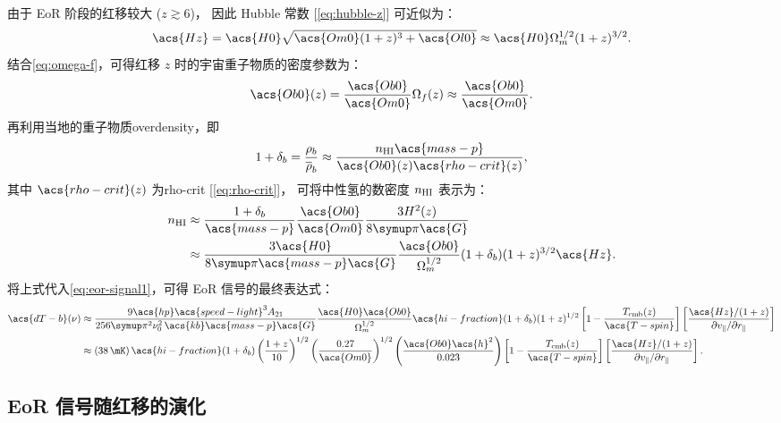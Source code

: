 由于 EoR 阶段的红移较大 ($z \gtrsim 6$)，
因此 Hubble 常数 [\autoref{eq:hubble-z}] 可近似为：
\begin{equation}
  \acs{Hz} = \acs{H0} \sqrt{\acs{Om0} (1+z)^3 + \acs{Ol0}}
    \approx \acs{H0} \Omega_m^{1/2} (1+z)^{3/2} .
\end{equation}
结合\autoref{eq:omega-f}，可得红移 $z$ 时的宇宙重子物质的密度参数为：
\begin{equation}
  \acs{Ob0}(z) = \frac{\acs{Ob0}}{\acs{Om0}} \Omega_f(z)
    \approx \frac{\acs{Ob0}}{\acs{Om0}} .
\end{equation}
再利用当地的重子物质\ac{overdensity}，即
\begin{equation}
  1 + \delta_b = \frac{\rho_b}{\overline{\rho}_b}
    \approx \frac{n_{\R{HI}} \acs{mass-p}}{\acs{Ob0}(z) \acs{rho-crit}(z)} ,
\end{equation}
其中 $\acs{rho-crit}(z)$ 为\acl{rho-crit} [\autoref{eq:rho-crit}]，
可将中性氢的数密度 $n_{\mathrm{HI}}$ 表示为：
\begin{align}
  n_{\R{HI}}
    & \approx \frac{1+\delta_b}{\acs{mass-p}} \frac{\acs{Ob0}}{\acs{Om0}}
      \frac{3 H^2(z)}{8 \Cpi \acs{G}}  \\
    & \approx \frac{3 \acs{H0}}{8\Cpi\acs{mass-p}\acs{G}}
      \frac{\acs{Ob0}}{\Omega_m^{1/2}} (1+\delta_b) (1+z)^{3/2} \acs{Hz} .
\end{align}
将上式代入\autoref{eq:eor-signal1}，可得 EoR 信号的最终表达式：
\begin{align}
  \acs{dT-b}(\nu)
    & \approx \frac{9 \acs{hp} \acs{speed-light}^3 A_{21}}{
      256\Cpi^2 \nu_0^2 \,\acs{kb} \acs{mass-p} \acs{G}}
      \frac{\acs{H0} \acs{Ob0}}{\Omega_m^{1/2}}
      \acs{hi-fraction} (1+\delta_b) (1+z)^{1/2}
      \left[ 1 - \frac{T_{\R{cmb}}(z)}{\acs{T-spin}} \right]
      \left[ \frac{\acs{Hz} / (1+z)}{
        \partial v_{\parallel} / \partial r_{\parallel}} \right]
  \label{eq:eor-signal2}  \\
    & \approx \left( \SI{38}{\mK} \right)
      \acs{hi-fraction} (1+\delta_b)
      \left( \frac{1+z}{10} \right)^{1/2}
      \left( \frac{0.27}{\acs{Om0}} \right)^{1/2}
      \left( \frac{\acs{Ob0} \acs{h}^2}{0.023} \right)
      \left[ 1 - \frac{T_{\R{cmb}}(z)}{\acs{T-spin}} \right]
      \left[ \frac{\acs{Hz} / (1+z)}{
        \partial v_{\parallel} / \partial r_{\parallel}} \right] .
  \label{eq:eor-signal3}
\end{align}

\subsection{EoR 信号随红移的演化}

